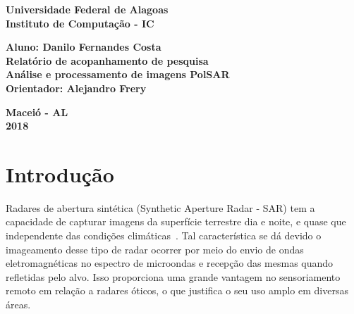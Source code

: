 \documentclass[12pt]{article}
\begin{document}
\begin{titlepage}
\begin{center}

\textbf{\LARGE Universidade Federal de Alagoas } \\[0.5cm]
\textbf{\large Instituto de Computação - IC}\\[0.2cm]

\vspace{20pt}

\vspace{20pt}
\vspace{20pt}
\vspace{20pt}
\vspace{20pt}
\vspace{20pt}
\vspace{20pt}
\vspace{20pt}
\vspace{20pt}

\textbf{\Large Aluno: Danilo Fernandes Costa}\\
\vspace{70pt}
\textbf{\LARGE Relatório de acopanhamento de pesquisa}\\
\vspace{20pt}
\textbf{\Large Análise e processamento de imagens PolSAR}\\
\vspace{70pt}
\textbf{\large Orientador: Alejandro Frery}\\

\vspace{45pt}
\end{center}

\par
\vfill
\begin{center}
\textbf{Maceió - AL}\\
\textbf{2018}
\end{center}

\end{titlepage}

\newpage

\section{Introdução}
Radares de abertura sintética (Synthetic Aperture Radar - SAR) tem a capacidade de capturar imagens da superfície terrestre dia e noite, e quase que independente das condições climáticas~\cite{Shen17}. Tal característica se dá devido o imageamento desse tipo de radar ocorrer por meio do envio de ondas eletromagnéticas no espectro de microondas e recepção das mesmas quando refletidas pelo alvo. Isso proporciona uma grande vantagem no sensoriamento remoto em relação a radares óticos, o que justifica o seu uso amplo em diversas áreas. 
\end{document}
